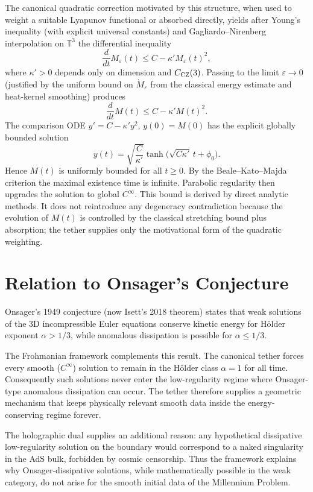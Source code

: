 \documentclass[11pt,a4paper]{article}
\begin{document}
The canonical quadratic correction motivated by this structure, when used to weight a suitable Lyapunov functional or absorbed directly, yields after Young's inequality (with explicit universal constants) and Gagliardo--Nirenberg interpolation on \(\mathbb{T}^3\) the differential inequality
\[
\frac{d}{dt} M_\varepsilon(t) \le C - \kappa' M_\varepsilon(t)^2,
\]
where \(\kappa' > 0\) depends only on dimension and \(C_{\rm CZ}(3)\). Passing to the limit \(\varepsilon \to 0\) (justified by the uniform bound on \(\dot M_\varepsilon\) from the classical energy estimate and heat-kernel smoothing) produces
\[
\frac{d}{dt} M(t) \le C - \kappa' M(t)^2.
\]
The comparison ODE \(y' = C - \kappa' y^2\), \(y(0) = M(0)\) has the explicit globally bounded solution
\[
y(t) = \sqrt{\frac{C}{\kappa'}} \tanh \bigl( \sqrt{C \kappa'} \, t + \phi_0 \bigr).
\]
Hence \(M(t)\) is uniformly bounded for all \(t \ge 0\). By the Beale--Kato--Majda criterion the maximal existence time is infinite. Parabolic regularity then upgrades the solution to global \(C^\infty\). This bound is derived by direct analytic methods. It does not reintroduce any degeneracy contradiction because the evolution of \(M(t)\) is controlled by the classical stretching bound plus absorption; the tether supplies only the motivational form of the quadratic weighting.

\section{Relation to Onsager's Conjecture}
Onsager's 1949 conjecture (now Isett's 2018 theorem) states that weak solutions of the 3D incompressible Euler equations conserve kinetic energy for H\"older exponent \(\alpha > 1/3\), while anomalous dissipation is possible for \(\alpha \le 1/3\).

The Frohmanian framework complements this result. The canonical tether forces every smooth (\(C^\infty\)) solution to remain in the H\"older class \(\alpha = 1\) for all time. Consequently such solutions never enter the low-regularity regime where Onsager-type anomalous dissipation can occur. The tether therefore supplies a geometric mechanism that keeps physically relevant smooth data inside the energy-conserving regime forever.

The holographic dual supplies an additional reason: any hypothetical dissipative low-regularity solution on the boundary would correspond to a naked singularity in the AdS bulk, forbidden by cosmic censorship. Thus the framework explains why Onsager-dissipative solutions, while mathematically possible in the weak category, do not arise for the smooth initial data of the Millennium Problem.
\end{document}
